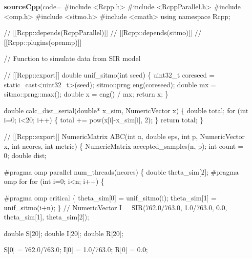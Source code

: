 \documentclass[
]{article}
\newenvironment{Shaded}{\begin{snugshade}}{\end{snugshade}}
\newcommand{\AttributeTok}[1]{\textcolor[rgb]{0.13,0.29,0.53}{#1}}
\newcommand{\FunctionTok}[1]{\textcolor[rgb]{0.13,0.29,0.53}{\textbf{#1}}}
\newcommand{\NormalTok}[1]{#1}
\newcommand{\StringTok}[1]{\textcolor[rgb]{0.31,0.60,0.02}{#1}}
\begin{document}
\begin{Shaded}
\begin{Highlighting}[]
\FunctionTok{sourceCpp}\NormalTok{(}\AttributeTok{code=}\StringTok{\textquotesingle{}}
\StringTok{\#include \textless{}Rcpp.h\textgreater{}}
\StringTok{\#include \textless{}RcppParallel.h\textgreater{}}
\StringTok{\#include \textless{}omp.h\textgreater{}}
\StringTok{\#include \textless{}sitmo.h\textgreater{}}
\StringTok{\#include \textless{}cmath\textgreater{}}
\StringTok{using namespace Rcpp;}

\StringTok{// [[Rcpp::depends(RcppParallel)]]}
\StringTok{// [[Rcpp::depends(sitmo)]]}
\StringTok{// [[Rcpp::plugins(openmp)]]}

\StringTok{// Function to simulate data from SIR model}

\StringTok{// [[Rcpp::export]]}
\StringTok{double unif\_sitmo(int seed) \{}
\StringTok{  uint32\_t coreseed = static\_cast\textless{}uint32\_t\textgreater{}(seed);}
\StringTok{  sitmo::prng eng(coreseed);}
\StringTok{  double mx = sitmo::prng::max();}
\StringTok{  double x = eng() / mx;}
\StringTok{  return x;}
\StringTok{\}}

\StringTok{double calc\_dist\_serial(double* x\_sim, NumericVector x) \{}
\StringTok{  double total;}
\StringTok{  for (int i=0; i\textless{}20; i++) \{}
\StringTok{    total += pow(x[i]{-}x\_sim[i], 2);}
\StringTok{  \}}
\StringTok{  return total;}
\StringTok{\}}

\StringTok{// [[Rcpp::export]]}
\StringTok{NumericMatrix ABC(int n, double eps, int p, NumericVector x, int ncores, int metric)}
\StringTok{\{}
\StringTok{  }
\StringTok{  NumericMatrix accepted\_samples(n, p);}
\StringTok{  int count = 0;}
\StringTok{  double dist;}

\StringTok{  \#pragma omp parallel num\_threads(ncores)}
\StringTok{  \{}
\StringTok{    double theta\_sim[2];}
\StringTok{    \#pragma omp for}
\StringTok{    for (int i=0; i\textless{}n; i++) \{}

\StringTok{      \#pragma omp critical}
\StringTok{      \{}
\StringTok{      theta\_sim[0] = unif\_sitmo(i);}
\StringTok{      theta\_sim[1] = unif\_sitmo(i+n);}
\StringTok{      \}}
\StringTok{      }
\StringTok{      // NumericVector I = SIR(762.0/763.0, 1.0/763.0, 0.0, theta\_sim[1], theta\_sim[2]);}

\StringTok{      double S[20];}
\StringTok{      double I[20];}
\StringTok{      double R[20];}

\StringTok{      S[0] = 762.0/763.0;}
\StringTok{      I[0] = 1.0/763.0;}
\StringTok{      R[0] = 0.0;}


\end{Highlighting}
\end{Shaded}
\end{document}
